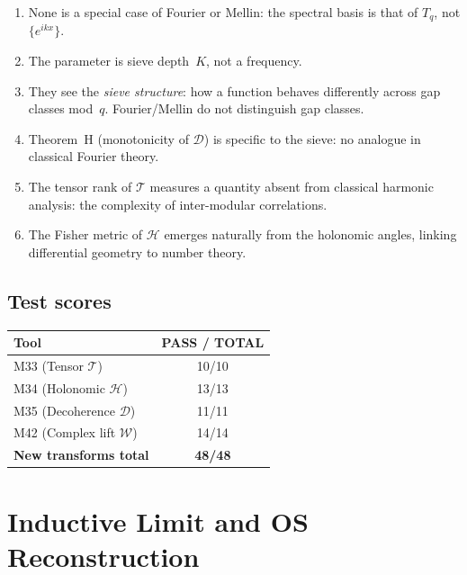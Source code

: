 \documentclass[12pt,a4paper]{article}
\begin{document}
\begin{enumerate}[nosep]
\item None is a special case of Fourier or Mellin: the spectral
  basis is that of $T_q$, not $\{e^{ikx}\}$.
\item The parameter is sieve depth~$K$, not a frequency.
\item They see the \emph{sieve structure}: how a function behaves
  differently across gap classes mod~$q$.  Fourier/Mellin do not
  distinguish gap classes.
\item Theorem~H (monotonicity of $\mathcal{D}$) is specific to the
  sieve: no analogue in classical Fourier theory.
\item The tensor rank of $\mathcal{T}$ measures a quantity absent from
  classical harmonic analysis: the complexity of inter-modular
  correlations.
\item The Fisher metric of $\mathcal{H}$ emerges naturally from the
  holonomic angles, linking differential geometry to number theory.
\end{enumerate}


\subsection*{Test scores}

\begin{center}
\begin{tabular}{lc}
\toprule
\textbf{Tool} & \textbf{PASS / TOTAL} \\
\midrule
M33 (Tensor $\mathcal{T}$) & 10/10 \\
M34 (Holonomic $\mathcal{H}$) & 13/13 \\
M35 (Decoherence $\mathcal{D}$) & 11/11 \\
M42 (Complex lift $\mathcal{W}$) & 14/14 \\
\midrule
\textbf{New transforms total} & \textbf{48/48} \\
\bottomrule
\end{tabular}
\end{center}


\newpage


\section{Inductive Limit and OS Reconstruction}
\label{app:os_limit}
\end{document}
